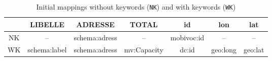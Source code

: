 \begin{table}[]
    \centering
    \begin{tabular}{|c|c|c|c|c|c|c|}
        \hline
         &   LIBELLE & ADRESSE & TOTAL & id & lon & lat \\
        \hline
        NK & -- & schema:adress & --&  mobivoc:id & -- & -- \\
        \hline
        WK & schema:label & schema:adress & mv:Capacity & dc:id & geo:long & geo:lat \\
        \hline
    \end{tabular}
    \caption{Initial mappings without keywords (\texttt{NK}) and with keywords (\texttt{WK})}
    \label{tab:expGrenoble}
\end{table}
\vspace{-0.5cm}